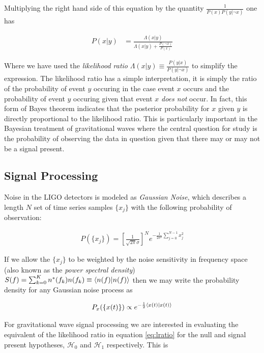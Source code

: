 \documentclass[paper=a4, fontsize=11pt]{scrartcl} %
\numberwithin{equation}{section} %
\numberwithin{figure}{section} %
\numberwithin{table}{section} %
\begin{document}
Multiplying the right hand side of this equation by the quantity $\frac{1}{P(x)P(y|\neg x)}$ one has 

\begin{align} \label{eq:lratio}
P(x|y) &= \frac{\Lambda(x|y)}{\Lambda(x|y) + \frac{P(\neg x)}{P(x)}}
\end{align}

Where we have used the \textit{likelihood ratio} $\Lambda(x|y) \equiv \frac{P(y|x)}{P(y|\neg x)}$ to simplify the expression. The likelihood ratio has a simple interpretation, it is simply the ratio of the probability of event $y$ occuring in the case event $x$ occurs and the probability of event $y$ occuring given that event $x$ \textit{does not} occur. In fact, this form of Bayes theorem indicates that the posterior probability for $x$ given $y$ is directly proportional to the likelihood ratio. This is particularly important in the Bayesian treatment of gravitational waves where the central question for study is the probability of observing the data in question given that there may or may not be a signal present.  

\subsection{Signal Processing}
Noise in the LIGO detectors is modeled as \textit{Gaussian Noise}, which describes a length $N$ set of time series samples $\{x_j\}$ with the following probability of observation:

\begin{align}
P(\{x_j\}) = \left[\frac{1}{\sqrt{2 \pi} \sigma}\right]^N e^{-\frac{1}{2 \sigma^2} \sum_{j = 0}^{N - 1}x_j^2}
\end{align}

If we allow the $\{x_j\}$ to be weighted by the noise sensitivity in frequency space (also known as the \textit{power spectral density}) $S(f) = \sum_{k=0}^K n^*(f_k)n(f_k) \equiv \braket{n(f)|n(f)}$ then we may write the probability density for any Gaussian noise process as 

\begin{align}
P_x(\{x(t)\}) \propto e^{-\frac{1}{2}\braket{x(t)|x(t)}}
\end{align}

For gravitational wave signal processing we are interested in evaluating the equivalent of the likelihood ratio  in equation \ref{eq:lratio} for the null and signal present hypotheses, $\mathcal{H}_0$ and $\mathcal{H}_1$ respectively. This is
\end{document}
